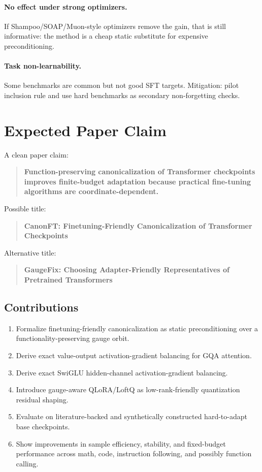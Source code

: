 \documentclass[11pt]{article}
\begin{document}
\paragraph{No effect under strong optimizers.}
If Shampoo/SOAP/Muon-style optimizers remove the gain, that is still informative: the method is a cheap static substitute for expensive preconditioning.

\paragraph{Task non-learnability.}
Some benchmarks are common but not good SFT targets. Mitigation: pilot inclusion rule and use hard benchmarks as secondary non-forgetting checks.

\section{Expected Paper Claim}

A clean paper claim:

\begin{quote}
\textbf{Function-preserving canonicalization of Transformer checkpoints improves finite-budget adaptation because practical fine-tuning algorithms are coordinate-dependent.}
\end{quote}

Possible title:

\begin{quote}
\textbf{CanonFT: Finetuning-Friendly Canonicalization of Transformer Checkpoints}
\end{quote}

Alternative title:

\begin{quote}
\textbf{GaugeFix: Choosing Adapter-Friendly Representatives of Pretrained Transformers}
\end{quote}

\subsection{Contributions}

\begin{enumerate}[leftmargin=*]
    \item Formalize finetuning-friendly canonicalization as static preconditioning over a functionality-preserving gauge orbit.
    \item Derive exact value-output activation-gradient balancing for GQA attention.
    \item Derive exact SwiGLU hidden-channel activation-gradient balancing.
    \item Introduce gauge-aware QLoRA/LoftQ as low-rank-friendly quantization residual shaping.
    \item Evaluate on literature-backed and synthetically constructed hard-to-adapt base checkpoints.
    \item Show improvements in sample efficiency, stability, and fixed-budget performance across math, code, instruction following, and possibly function calling.
\end{enumerate}
\end{document}

